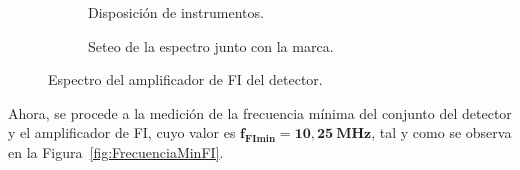     \begin{figure}[H]
      \centering
      \begin{subfigure}[ht]{0.48\textwidth}
        \caption{Disposición de instrumentos.}
        \label{fig:InstrumentosParaFI}
      \end{subfigure}
      \hfill 
      \begin{subfigure}[ht]{0.48\textwidth}
        \caption{Seteo de la espectro junto con la marca.}
        \label{fig:EspectroaFI}
      \end{subfigure}

      \caption{Espectro del amplificador de FI del detector.}
      \label{fig:MediccionEspectroFIDetector}
    \end{figure}

    Ahora, se procede a la medición de la frecuencia mínima del conjunto del detector y el amplificador de FI,
    cuyo valor es $\mathbf{f_{FImin} = 10,25~MHz}$, tal y como se observa en la Figura~\ref{fig:FrecuenciaMinFI}.

